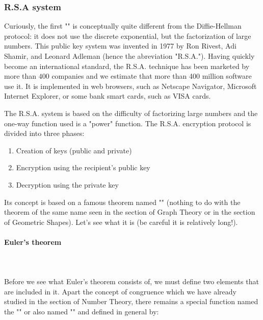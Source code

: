 	\subsubsection{R.S.A system}
	Curiously, the first "" is conceptually quite different from the Diffie-Hellman protocol: it does not use the discrete exponential, but the factorization of large numbers. This public key system was invented in 1977 by Ron Rivest, Adi Shamir, and Leonard Adleman (hence the abreviation "R.S.A."). Having quickly become an international standard, the R.S.A. technique has been marketed by more than $400$ companies and we estimate that more than 400 million software use it. It is implemented in web browsers, such as Netscape Navigator, Microsoft Internet Explorer, or some bank smart cards, such as VISA cards.

	The R.S.A. system is based on the difficulty of factorizing large numbers and the one-way function used is a "power" function. The R.S.A. encryption protocol is divided into three phases:
	\begin{enumerate}
		\item Creation of keys (public and private)

		\item Encryption using the recipient's public key

		\item Decryption using the private key
	\end{enumerate}
	Its concept is based on a famous theorem named "" (nothing to do with the theorem of the same name seen in the section of Graph Theory or in the section of Geometric Shapes). Let's see what it is (be careful it is relatively long!).
	
	\paragraph{Euler's theorem}\mbox{}\\\\
	Before we see what Euler's theorem consists of, we must define two elements that are included in it. Apart the concept of congruence which we have already studied in the section of Number Theory, there remains a special function named the "\label{euler indicator function cryptography}" or also named "" and defined in general by:
	
